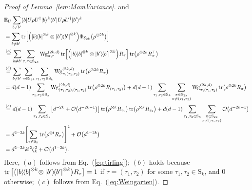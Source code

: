 \documentclass[aps,prl,twocolumn,nofootinbib,superscriptaddress,10pt]{revtex4-2}
\let\originalleft\left
\let\originalright\right
\renewcommand{\left}{\mathopen{}\mathclose\bgroup\originalleft}
\renewcommand{\right}{\aftergroup\egroup\originalright}
\def\E{ {\mathbb E} } %
\def\>{\rangle}
\def\<{\langle}
\newcommand{\ketbra}[2]{\ensuremath{\left|#1\right\rangle\!\left\langle#2\right|}}
\DeclareMathOperator{\Tr}{tr}
\newcommand{\bigo}[1]{\mathcal{O}\left(#1\right)}
\theoremstyle{plain}
\theoremstyle{definition}
\newcommand{\Wg}{\mathrm{Wg}}
\newcommand{\eref}[1]{Eq.~\textup{(\ref{#1})}}
\newcommand{\lref}[1]{Lemma~\ref{#1}}
\begin{document}
\begin{proof}[Proof of \lref{lem:MomVariance}]
and  
\begin{align}
&\E_{U} \sum_{b\ne b'} \<b|U\rho U^{\dag}|b\>^{k} \<b'|U\rho U^{\dag}|b'\>^{k}
\nonumber\\
&=  \sum_{b\ne b'} \Tr\left[ \left( \ketbra{b}{b}^{\otimes k}\otimes \ketbra{b'}{b'}^{\otimes k}\right)  
\Phi_{\mathcal E_{2k}}\left( \rho^{\otimes 2k} \right) \right] 
\nonumber\\
&\stackrel{(a)}{=}\sum_{b\ne b'} \sum_{\tau,\pi\in \mathrm{S}_{2k}} \Wg_{\pi,\tau}^{(2k,d)} 
 \Tr\left[ \left( \ketbra{b}{b}^{\otimes k}\otimes \ketbra{b'}{b'}^{\otimes k}\right) R_{\tau} \right] 
 \Tr\left( \rho^{\otimes 2k}  R_{\pi}^{\top} \right) 
\nonumber\\
&\stackrel{(b)}{=}\sum_{b\ne b'} \sum_{\pi\in \mathrm{S}_{2k}} \sum_{\tau_1,\tau_2\in \mathrm{S}_k}
\Wg_{\pi,(\tau_1,\tau_2)}^{(2k,d)}
\Tr\left( \rho^{\otimes 2k}  R_{\pi} \right) 
\nonumber\\
&=d(d-1)\sum_{\tau_1,\tau_2\in \mathrm{S}_k}
\Wg_{(\tau_1,\tau_2),(\tau_1,\tau_2)}^{(2k,d)}  
\Tr\left( \rho^{\otimes 2k}  R_{(\tau_1,\tau_2)} \right) 
+d(d-1)\sum_{\tau_1,\tau_2\in \mathrm{S}_k}\sum_{\substack{\pi\in\mathrm{S}_{2k}\\ \pi\ne(\tau_1,\tau_2)}} 
\Wg_{\pi,(\tau_1,\tau_2)}^{(2k,d)}  
\Tr\left( \rho^{\otimes 2k}  R_{\pi} \right)
\nonumber\\
&\stackrel{(c)}{=}d(d-1)\sum_{\tau_1,\tau_2\in \mathrm{S}_k}
\left[ d^{-2k}+ \bigo{d^{-2k-1}}\right]  
\Tr\left( \rho^{\otimes k}  R_{\tau_1} \right) \Tr\left( \rho^{\otimes k}  R_{\tau_2} \right) 
+d(d-1)\sum_{\tau_1,\tau_2\in \mathrm{S}_k}\sum_{\substack{\pi\in\mathrm{S}_{2k}\\ \pi\ne(\tau_1,\tau_2)}}  \bigo{d^{-2k-1}}
\nonumber\\
&= 
d^{2-2k} \left[ \sum_{\tau \in \mathrm{S}_{k}} \Tr\left(\rho^{\otimes t}R_\tau\right) \right]^2 
+\bigo{d^{1-2k}}
\nonumber\\
&=d^{2-2k} k!^2\zeta_k^2  +\bigo{d^{1-2k}}.
\end{align}
Here,
$(a)$ follows from \eref{eq:tirling}; 
$(b)$ holds because $\Tr\big[ \big( \ketbra{b}{b}^{\otimes k}\!\otimes \ketbra{b'}{b'}^{\otimes k}\big) R_{\tau} \big]=1$ if $\tau=(\tau_1,\tau_2)$ for some $\tau_1,\tau_2\in\mathrm{S}_{k}$, and 0 otherwise; 
$(c)$ follows from \eref{eq:Weingarten}.   


\end{proof}
\end{document}
